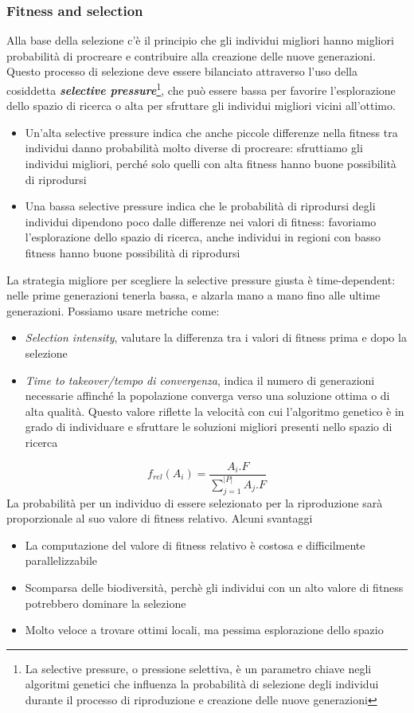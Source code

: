 \subsubsection{Fitness and selection}
Alla base della selezione c’è il principio che gli individui migliori hanno migliori probabilità di procreare e contribuire alla creazione delle nuove generazioni. Questo processo di selezione deve essere bilanciato attraverso l'uso della cosiddetta \textbf{\textit{selective pressure}}\footnote{La selective pressure, o pressione selettiva, è un parametro chiave negli algoritmi genetici che influenza la probabilità di selezione degli individui durante il processo di riproduzione e creazione delle nuove generazioni}, che può essere bassa per favorire l'esplorazione dello spazio di ricerca o alta per sfruttare gli individui migliori vicini all'ottimo. 
\begin{itemize}
    \item Un’alta selective pressure indica che anche piccole differenze nella fitness tra individui danno probabilità molto diverse di procreare: sfruttiamo gli individui migliori, perché solo quelli con alta fitness hanno buone possibilità di riprodursi
    \item Una bassa selective pressure indica che le probabilità di riprodursi degli individui dipendono poco dalle differenze nei valori di fitness: favoriamo l’esplorazione dello spazio di ricerca, anche individui in regioni con basso fitness hanno buone possibilità di riprodursi
\end{itemize}
La strategia migliore per scegliere la selective pressure giusta è time-dependent: nelle prime generazioni tenerla bassa, e alzarla mano a mano fino alle ultime generazioni. Possiamo usare metriche come:
\begin{itemize}
    \item \textit{Selection intensity}, valutare la differenza tra i valori di fitness prima e dopo la selezione
    \item \textit{Time to takeover/tempo di convergenza},  indica il numero di generazioni necessarie affinché la popolazione converga verso una soluzione ottima o di alta qualità. Questo valore riflette la velocità con cui l'algoritmo genetico è in grado di individuare e sfruttare le soluzioni migliori presenti nello spazio di ricerca
\end{itemize}
$$f_{rel}(A_i) = \frac{A_i.F}{\sum_{j=1}^{|P|} A_j.F}$$
La probabilità per un individuo di essere selezionato per la riproduzione sarà proporzionale al suo valore di fitness relativo. Alcuni svantaggi
\begin{itemize}
    \item La computazione del valore di fitness relativo è costosa e difficilmente parallelizzabile
    \item Scomparsa delle biodiversità, perchè gli individui con un alto valore di fitness potrebbero dominare la selezione
    \item Molto veloce a trovare ottimi locali, ma pessima esplorazione dello spazio
\end{itemize}

